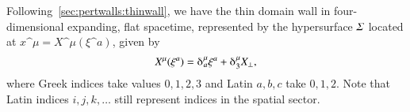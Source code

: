 




\newcommand{\hypsurf}{\ALIAShypsurf}
\newcommand{\pert}{\ALIASpert}



Following~\cref{sec:pertwalls:thinwall}, we have the thin domain wall in four-dimensional expanding, flat spacetime, represented by the hypersurface $\hypsurf$ located at $x\^\mu = X\^\mu(\xi\^a)$, given by
\begin{equation}
    X\^\mu(\xi\^a) = \Krondelta*{^{\mu}_a}\xi\^a + \Krondelta*{^{\mu}_3} X_\bot,%
\end{equation}
where Greek indices take values $0,1,2,3$ and Latin $a, b, c$ take $0,1,2$. Note that Latin indices $i,j,k, \dots$ still represent indices in the spatial sector.

